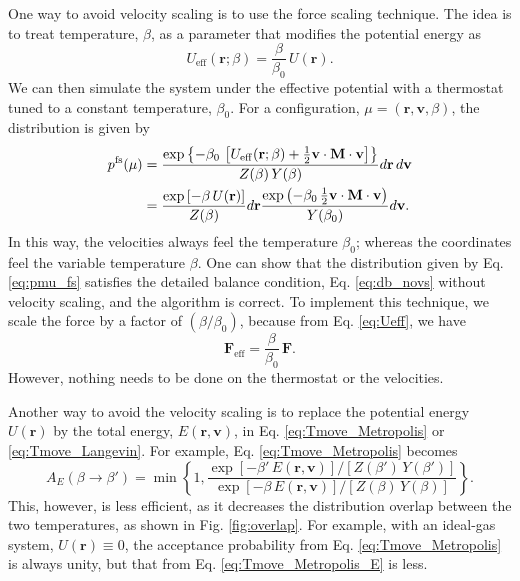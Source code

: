 \documentclass[11pt]{article}
\begin{document}
One way to avoid velocity scaling is to use the force scaling technique.
%
The idea is to treat temperature, $\beta$, as a parameter that
modifies the potential energy as
%
\begin{equation}
  U_\mathrm{eff}(\mathbf r; \beta)
  =
  \frac{ \beta } { \beta_0 } \,
  U(\mathbf r)
  .
\label{eq:Ueff}
\end{equation}
%
We can then simulate the system under the effective potential
with a thermostat tuned to a constant temperature, $\beta_0$.
%
For a configuration, $\mu = (\mathbf r, \mathbf v, \beta)$,
the distribution is given by
%
\begin{align}
  p^\mathrm{fs}(\mu)
  &=
  \frac{
    \exp\left\{
      -\beta_0 \,
      \left[
          U_\mathrm{eff}(\mathbf r; \beta)
          +\frac{1}{2} \mathbf v \cdot \mathbf M \cdot \mathbf v
      \right]
    \right\}
  }
  {
    Z(\beta) \, Y(\beta)
  }
  d \mathbf r \,
  d \mathbf v
  \notag
\\
  &=
  \frac{
    \exp\left[
       -\beta \, U(\mathbf r)
    \right]
  }
  {
    Z(\beta)
  }
  d \mathbf r
  \frac{
    \exp\left(
      -\beta_0 \, \frac{1}{2} \mathbf v \cdot \mathbf M \cdot \mathbf v
    \right)
  }
  {
    Y(\beta_0)
  }
  d \mathbf v
  .
\label{eq:pmu_fs}
\end{align}
%
In this way, the velocities always feel the temperature $\beta_0$;
whereas the coordinates feel the variable temperature $\beta$.
%
One can show that the distribution given by Eq. \eqref{eq:pmu_fs}
satisfies the detailed balance condition, Eq. \eqref{eq:db_novs}
without velocity scaling,
and the algorithm is correct.
%
To implement this technique, we scale the force by
a factor of $(\beta / \beta_0)$, because from Eq. \eqref{eq:Ueff},
we have
%
$$
\mathbf F_\mathrm{eff} = \frac{ \beta } { \beta_0 } \, \mathbf F.
$$
However, nothing needs to be done on the thermostat or the velocities.



Another way to avoid the velocity scaling is to replace
the potential energy $U(\mathbf r)$ by the total energy,
$E(\mathbf r, \mathbf v)$,
in Eq. \eqref{eq:Tmove_Metropolis} or \eqref{eq:Tmove_Langevin}.
%
For example, Eq. \eqref{eq:Tmove_Metropolis} becomes
%
\begin{equation}
  A_E(\beta \to \beta')
  =
  \min\left\{
    1,
    \frac{
      \exp[ -\beta' \, E(\mathbf r, \mathbf v) ] /
      [Z(\beta') \, Y(\beta')]
    }
    {
      \exp[ -\beta \, E(\mathbf r, \mathbf v) ] /
      [Z(\beta) \, Y(\beta)]
    }
  \right\}
  .
\label{eq:Tmove_Metropolis_E}
\end{equation}
%
This, however, is less efficient,
as it decreases the distribution overlap between the two temperatures,
as shown in Fig. \ref{fig:overlap}.
%
For example, with an ideal-gas system, $U(\mathbf r) \equiv 0$,
the acceptance probability from Eq. \eqref{eq:Tmove_Metropolis}
is always unity, but that from Eq. \eqref{eq:Tmove_Metropolis_E}
is less.
\end{document}
